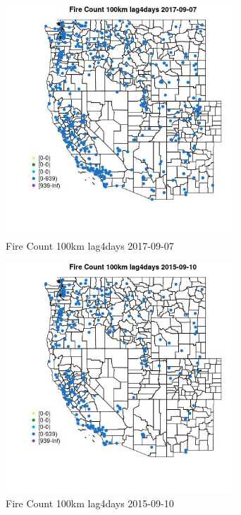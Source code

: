 \begin{figure} 
\centering  
\includegraphics[width=0.77\textwidth]{Code_Outputs/Report_ML_input_PM25_Step4_part_e_de_duplicated_aves_compiled_2019-05-20wNAs_MapObsFire_Count_100km_lag4days2017-09-07.jpg} 
\caption{\label{fig:Report_ML_input_PM25_Step4_part_e_de_duplicated_aves_compiled_2019-05-20wNAsMapObsFire_Count_100km_lag4days2017-09-07}Fire Count 100km lag4days 2017-09-07} 
\end{figure} 
 

\begin{figure} 
\centering  
\includegraphics[width=0.77\textwidth]{Code_Outputs/Report_ML_input_PM25_Step4_part_e_de_duplicated_aves_compiled_2019-05-20wNAs_MapObsFire_Count_100km_lag4days2015-09-10.jpg} 
\caption{\label{fig:Report_ML_input_PM25_Step4_part_e_de_duplicated_aves_compiled_2019-05-20wNAsMapObsFire_Count_100km_lag4days2015-09-10}Fire Count 100km lag4days 2015-09-10} 
\end{figure} 
 

